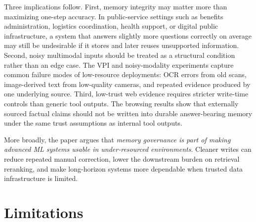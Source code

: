 \documentclass{article}
\begin{document}
Three implications follow. First, memory integrity may matter more than maximizing one-step accuracy. In public-service settings such as benefits administration, logistics coordination, health support, or digital public infrastructure, a system that answers slightly more questions correctly on average may still be undesirable if it stores and later reuses unsupported information. Second, noisy multimodal inputs should be treated as a structural condition rather than an edge case. The VPI and noisy-modality experiments capture common failure modes of low-resource deployments: OCR errors from old scans, image-derived text from low-quality cameras, and repeated evidence produced by one underlying source. Third, low-trust web evidence requires stricter write-time controls than generic tool outputs. The browsing results show that externally sourced factual claims should not be written into durable answer-bearing memory under the same trust assumptions as internal tool outputs.

More broadly, the paper argues that \emph{memory governance is part of making advanced ML systems usable in under-resourced environments}. Cleaner writes can reduce repeated manual correction, lower the downstream burden on retrieval reranking, and make long-horizon systems more dependable when trusted data infrastructure is limited.

\section{Limitations}
\end{document}
